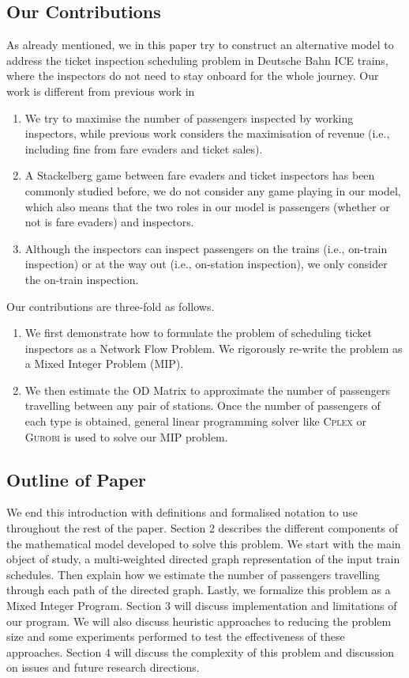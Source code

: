 \documentclass[11pt]{article}
\begin{document}
\subsection{Our Contributions}
As already mentioned, we in this paper try to construct an alternative model to 
address the ticket inspection scheduling problem in Deutsche Bahn ICE trains, where the inspectors
do not need to stay onboard for the whole journey. Our work is different from previous work in 
\begin{enumerate}
    \item We try to maximise the number of passengers inspected by working inspectors, while previous work considers the maximisation of revenue (i.e., including 
    fine from fare evaders and ticket sales).
    \item A Stackelberg game between fare evaders and ticket inspectors has been commonly studied 
    before, we do not consider any game playing in our model, which also means that the two roles
    in our model is passengers (whether or not is fare evaders) and inspectors.
    \item Although the inspectors can inspect passengers on the trains (i.e., on-train inspection)
    or at the way out (i.e., on-station inspection), we only consider the on-train inspection.  
\end{enumerate}
Our contributions are three-fold as follows.
\begin{enumerate}
    \item  We first demonstrate how to formulate the problem of scheduling ticket inspectors 
    as a Network Flow Problem. We rigorously re-write the problem as a 
    Mixed Integer Problem (MIP).
    \item We then estimate the OD Matrix to approximate the number of 
    passengers travelling between any pair of stations. Once the number of passengers 
    of each type is obtained, general linear programming solver like 
    \textsc{Cplex} or \textsc{Gurobi} is used to solve our MIP problem.
\end{enumerate}

\subsection{Outline of Paper}
\par We end this introduction with definitions and formalised notation to use throughout the rest of the paper. Section 2 describes the different components of the mathematical model developed to solve this problem. We start with the main object of study, a multi-weighted directed graph representation of the input train schedules. Then explain how we estimate the number of passengers travelling through each path of the directed graph. Lastly, we formalize this problem as a Mixed Integer Program. Section 3 will discuss implementation and limitations of our program. We will also discuss heuristic approaches to reducing the problem size and some experiments performed to test the effectiveness of these approaches. Section 4 will discuss the complexity of this problem and discussion on issues and future research directions.
\end{document}
